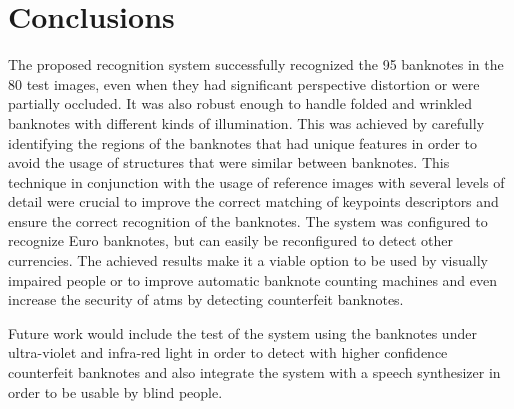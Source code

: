 \section{Conclusions}\label{sec:conclusions}

The proposed recognition system successfully recognized the 95 banknotes in the 80 test images, even when they had significant perspective distortion or were partially occluded. It was also robust enough to handle folded and wrinkled banknotes with different kinds of illumination. This was achieved by carefully identifying the regions of the banknotes that had unique features in order to avoid the usage of structures that were similar between banknotes. This technique in conjunction with the usage of reference images with several levels of detail were crucial to improve the correct matching of keypoints descriptors and ensure the correct recognition of the banknotes. The system was configured to recognize Euro banknotes, but can easily be reconfigured to detect other currencies. The achieved results make it a viable option to be used by visually impaired people or to improve automatic banknote counting machines and even increase the security of \glspl{atm} by detecting counterfeit banknotes.

Future work would include the test of the system using the banknotes under ultra-violet and infra-red light in order to detect with higher confidence counterfeit banknotes and also integrate the system with a speech synthesizer in order to be usable by blind people.
